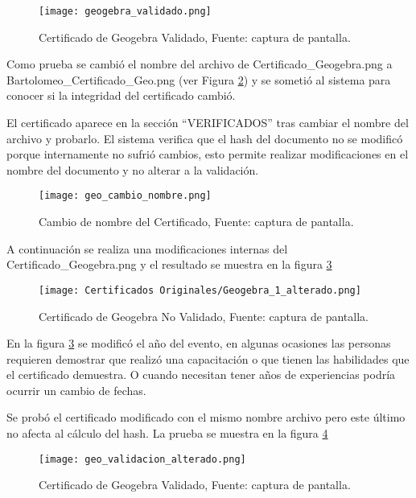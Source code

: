 \begin{figure}[H]
  \centering
  {\texttt{[image: geogebra\_validado.png]}}
  \caption{Certificado de Geogebra Validado,  Fuente: captura de pantalla. }
  \label{img:geogebra_validado}
\end{figure}

Como prueba se cambió el nombre del archivo de Certificado\_Geogebra.png a Bartolomeo\_Certificado\_Geo.png (ver Figura \ref{img:geogebra_cambio_nombre}) 
y se sometió al sistema 
para conocer si la integridad del certificado cambió. 

El  certificado aparece en la sección “VERIFICADOS” tras cambiar el nombre del archivo y probarlo. El sistema 
verifica que el hash del documento no 
se modificó porque internamente no sufrió cambios, esto permite  realizar modificaciones en el nombre del documento y no alterar a la validación.

\begin{figure}[H]
  \centering
  {\texttt{[image: geo\_cambio\_nombre.png]}}
  \caption{Cambio de nombre del Certificado,  Fuente: captura de pantalla. }
  \label{img:geogebra_cambio_nombre}
\end{figure}

A continuación se realiza una modificaciones internas  del Certificado\_Geogebra.png y el resultado se muestra en la figura  \ref{img:geogebra_alterado}

\begin{figure}[H]
  \centering
  {\texttt{[image: Certificados Originales/Geogebra\_1\_alterado.png]}}
  \caption{Certificado de Geogebra No Validado,  Fuente: captura de pantalla. }
  \label{img:geogebra_alterado}
\end{figure}

En la figura \ref{img:geogebra_alterado} se modificó el año del evento,  en algunas ocasiones las personas requieren
demostrar que realizó una capacitación o que tienen las habilidades que el certificado
demuestra. O cuando necesitan tener años de experiencias podría ocurrir un cambio de fechas.

Se probó el certificado modificado con el mismo nombre archivo pero este último no afecta al cálculo del hash. La prueba se muestra en
la figura \ref{img:geogebra_alterado_prueba} 

\begin{figure}[H]
  \centering
  {\texttt{[image: geo\_validacion\_alterado.png]}}
  \caption{Certificado de Geogebra Validado,  Fuente: captura de pantalla. }
  \label{img:geogebra_alterado_prueba}
\end{figure}

